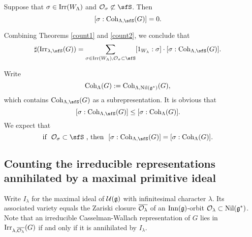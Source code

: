 \documentclass[counting_main.tex]{subfiles}
\begin{document}


\begin{prop}\label{count2}
Suppose that $\sigma\in  \mathrm{Irr}(W_\Lambda)$ and $\CO_\sigma\nsubset \sfS$. Then
  \[
    [\sigma: \Coh_{\Lambda,\sfS}(G)]=0.
  \]

\end{prop}

Combining Theorems \ref{count1} and \ref{count2}, we conclude that
  \begin{equation}\label{leq2}
  \sharp(\Irr_{\lambda,\sfS}(G)) = \sum_{\sigma\in \Irr(W_\Lambda), \CO_\sigma\subset \sfS} [1_{W_{\lambda}}: \sigma]\cdot [\sigma: \Coh_{\Lambda,\sfS}(G)].
    \end{equation}

Write
\[
  \mathrm{Coh}_{\Lambda}(G):= \mathrm{Coh}_{\Lambda,\mathrm{Nil}(\mathfrak g^*)}(G),
  \]
  which contains $ \Coh_{\Lambda,\sfS}(G)$ as a subrepresentation. It is obvious that
  \begin{equation}\label{leq1}
    [\sigma: \Coh_{\Lambda,\sfS}(G)]\leq [\sigma: \Coh_{\Lambda}(G)].
  \end{equation}
  We expect that
   \begin{equation}\label{leq1}
  \textrm{if $\ \CO_\sigma\subset \sfS\ $, then  }\  [\sigma: \Coh_{\Lambda,\sfS}(G)]= [\sigma: \Coh_{\Lambda}(G)].
  \end{equation}







\subsection{Counting the irreducible representations annihilated by a maximal primitive ideal}
Write $I_\lambda$ for the maximal ideal of $\mathcal U(\mathfrak g)$ with infinitesimal character $\lambda$. Its associated variety equals the Zariski closure $\overline{{\mathcal {O}}_\lambda}$ of an $\mathrm{Inn}(\mathfrak g)$-orbit  ${\mathcal {O}}_\lambda\subset\mathrm{Nil}(\mathfrak g^*) $.  Note that an irreducible Casselman-Wallach representation of $G$ lies in $\mathrm{Irr}_{\lambda,\overline{{\mathcal {O}}_\lambda}}(G)$ if and only if it is annihilated by $I_\lambda$.
\end{document}
